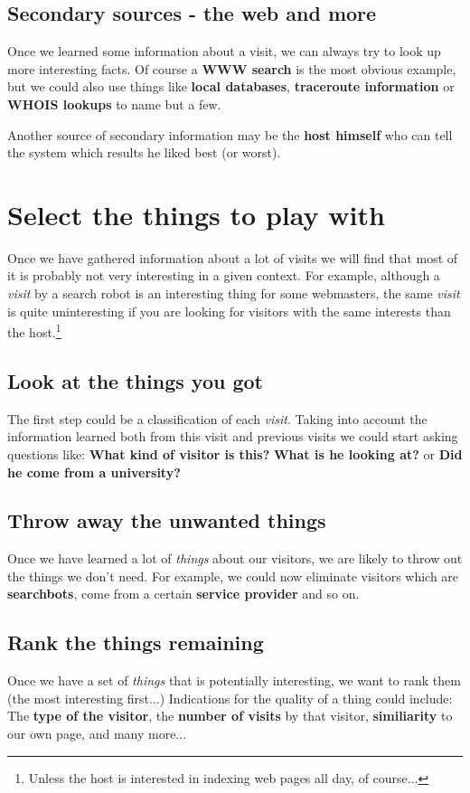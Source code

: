 \documentclass[a4paper]{danarticle}
\begin{document}
    \subsection*{Secondary sources - the web and more}
      Once we learned some information about a visit, we can always try to look
      up more interesting facts. Of course a \textbf{WWW search} is the most
      obvious example, but we could also use things like \textbf{local
      databases}, \textbf{traceroute information} or \textbf{WHOIS lookups} to
      name but a few.
      
      Another source of secondary information may be the \textbf{host himself}
      who can tell the system which results he liked best (or worst).
  \section*{Select the things to play with}
    Once we have gathered information about a lot of visits we will find that
    most of it is probably not very interesting in a given context. For example,
    although a \textit{visit} by a search robot is an interesting thing for some
    webmasters, the same \textit{visit} is quite uninteresting if you are looking
    for visitors with the same interests than the host.\footnote{Unless the host
    is interested in indexing web pages all day, of course...}
    \subsection*{Look at the things you got}
      The first step could be a classification of each \textit{visit}. Taking into
      account the information learned both from this visit and previous visits
      we could start asking questions like: \textbf{What kind of visitor is
      this?} \textbf{What is he looking at?} or \textbf{Did he come from a
      university?}
    \subsection*{Throw away the unwanted things}
      Once we have learned a lot of \textit{things} about our visitors, 
      we are likely to
      throw out the things we don't need. For example, we could now eliminate
      visitors which are \textbf{searchbots}, come from a certain
      \textbf{service provider} and so on.
    \subsection*{Rank the things remaining}
      Once we have a set of \textit{things} that is potentially interesting, 
      we want to
      rank them (the most interesting first...) Indications for the quality of a
      thing could include: The \textbf{type of the visitor}, the \textbf{number
      of visits} by that visitor, \textbf{similiarity} to our own page, and many
      more...
\end{document}
